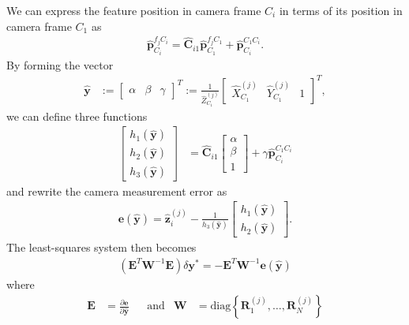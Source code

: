 \documentclass[letterpaper, 10 pt, conference]{ieeeconf}  %
\def\Vec#1{\mathbf{#1}}
\newcommand{\bbm}{\begin{bmatrix}}
\newcommand{\ebm}{\end{bmatrix}}
\begin{document}
We can express the feature position in camera frame $C_i$ in terms of its position in camera frame $C_1$ as
\begin{align}
\hat{\Vec{p}}_{C_i}^{f_j C_i} = \hat{\Vec{C}}_{i1} \hat{\Vec{p}}_{C_1}^{f_j C_1}  + \hat{\Vec{p}}_{C_i}^{C_1 C_i} .
\end{align}
By forming the vector
\begin{align}
\hat{\Vec{y}} &:= \bbm \alpha & \beta & \gamma \ebm^T := \frac{1}{\hat{Z}^{(j)}_{C_1}} \bbm \hat{X}^{(j)}_{C_1} & \hat{Y}^{(j)}_{C_1} & 1 \ebm ^T ,
\end{align}
we can define three functions
\begin{align}
    \bbm h_1 (\hat{\Vec{y}}) \\ h_2 (\hat{\Vec{y}}) \\ h_3 (\hat{\Vec{y}}) \ebm 
    & = \hat{\Vec{C}}_{i1} \bbm \alpha \\ \beta \\ 1 \ebm + \gamma  \hat{\Vec{p}}_{C_i}^{C_1 C_i}
\end{align}
and rewrite the camera measurement error as
\begin{align}
\Vec e(\hat{\Vec{y}}) = \hat{\Vec{z}}_i^{(j)} - \frac{1}{h_3 (\hat{\Vec{y}}) } \bbm h_1 (\hat{\Vec{y}}) \\ h_2 (\hat{\Vec{y}}) \ebm .
\end{align}
The least-squares system then becomes
\begin{align}
(\Vec  E^T \Vec W ^{-1} \Vec E ) \delta \Vec{y}^*  = - \Vec{E}^T\Vec{W}^{-1}\Vec{e}(\hat{\Vec{y}})
\end{align}
where
\begin{align}
\Vec E &= \frac{\partial \Vec e}{\partial \hat{\Vec{y}}}
& &
\text{and}
&
\Vec W &= \text{diag}\left\{ \Vec{R}_1^{(j)}, \hdots, \Vec{R}_N^{(j)} \right\}
\end{align}
\end{document}
